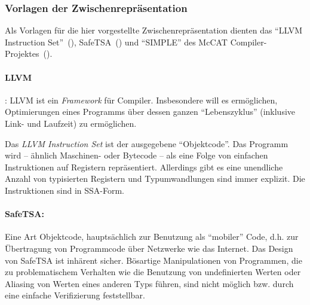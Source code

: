 \documentclass[twoside,a4paper,fleqn,12pt]{article}
\begin{document}



\subsubsection{Vorlagen der Zwischenrepräsentation}

Als Vorlagen für die hier vorgestellte Zwischenrepräsentation dienten das ``LLVM Instruction Set''~(\cite{LLVM:CGO04}),
SafeTSA~(\cite{SafeTSA}) und ``SIMPLE'' des McCAT Compiler-Projektes~(\cite{SIMPLE}).


\paragraph{LLVM}: LLVM ist ein \emph{Framework} für Compiler. Insbesondere will es ermöglichen, Optimierungen
eines Programms über dessen ganzen "`Lebenszyklus"' (inklusive Link- und Laufzeit) zu ermöglichen.

Das \emph{LLVM Instruction Set} ist der ausgegebene "`Objektcode"'. Das Programm wird -- ähnlich Maschinen-
oder Bytecode -- als eine Folge von einfachen Instruktionen auf Registern repräsentiert. 
Allerdings gibt es eine unendliche Anzahl von typisierten Registern und Typumwandlungen sind immer explizit.
Die Instruktionen sind in SSA-Form.



\paragraph{SafeTSA:} Eine Art Objektcode, hauptsächlich zur Benutzung
als "`mobiler"' Code, d.h. zur Übertragung von Programmcode über Netzwerke wie das Internet.
Das Design von SafeTSA ist inhärent sicher. Bösartige Manipulationen von Programmen, die zu
problematischem Verhalten wie die Benutzung von undefinierten Werten oder Aliasing von Werten
eines anderen Typs führen, sind nicht möglich bzw. durch eine einfache Verifizierung feststellbar.
\end{document}
